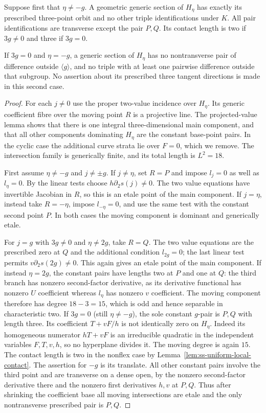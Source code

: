 \begin{lemma}
\label{lem:ss-third-value-other-collisions}
Suppose first that $\eta\ne-g$. A geometric generic section of
$H_\eta$ has exactly its prescribed three-point orbit and no
other triple identifications under $K$. All pair identifications
are transverse except the pair $P,Q$. Its contact length is two
if $3g\ne0$ and three if $3g=0$.

If $3g=0$ and $\eta=-g$, a generic section of $H_\eta$ has no
nontransverse pair of difference outside $\langle g\rangle$,
and no triple with at least one pairwise difference outside that subgroup.
No assertion about its prescribed three tangent directions is
made in this second case.
\end{lemma}
\begin{proof}
For each $j\ne0$ use the proper two-value incidence over $H_\eta$.
Its generic coefficient fibre over the moving point $R$ is a
projective line. The projected-value lemma shows that there is
one integral three-dimensional main component, and that all other
components dominating $H_\eta$ are the constant base-point pairs.
In the cyclic case the additional curve strata lie over $F=0$,
which we remove. The intersection family is generically finite,
and its total length is $L^2=18$.

First assume $\eta\ne-g$ and $j\ne\pm g$.
If $j\ne\eta$, set $R=P$ and impose $l_j=0$ as well as
$l_\eta=0$. By the linear tests choose $h\partial_2s(j)\ne0$.
The two value equations have invertible Jacobian in $R$, so this
is an etale point of the main component. If $j=\eta$, instead
take $R=-\eta$, impose $l_{-\eta}=0$, and use the same test
with the constant second point $P$. In both cases the moving
component is dominant and generically etale.

For $j=g$ with $3g\ne0$ and $\eta\ne2g$, take $R=Q$.
The two value equations are the prescribed zero at $Q$ and the
additional condition $l_{2g}=0$; the last linear test permits
$v\partial_2s(2g)\ne0$. This again gives an etale point of the
main component. If instead $\eta=2g$, the constant pairs have
lengths two at $P$ and one at $Q$: the third branch has nonzero
second-factor derivative, as its derivative functional has nonzero $U$
coefficient whereas $l_\eta$ has nonzero $v$ coefficient.
The moving component therefore has degree $18-3=15$, which is
odd and hence separable in characteristic two.
If $3g=0$ (still $\eta\ne-g$), the sole constant $g$-pair is
$P,Q$ with length three. Its coefficient $T+vF/h$ is not identically
zero on $H_\eta$. Indeed its homogeneous numerator $hT+vF$ is an
irreducible quadratic in the independent variables $F,T,v,h$,
so no hyperplane divides it. The moving degree is again $15$.
The contact length is two in the nonflex case by
Lemma~\ref{lem:ss-uniform-local-contact}. The assertion for $-g$
is its translate. All other constant pairs involve the third point
and are transverse on a dense open, by the nonzero second-factor derivative
there and the nonzero first derivatives $h,v$ at $P,Q$.
Thus after shrinking the coefficient base all moving intersections
are etale and the only nontransverse prescribed pair is $P,Q$.


\end{proof}
